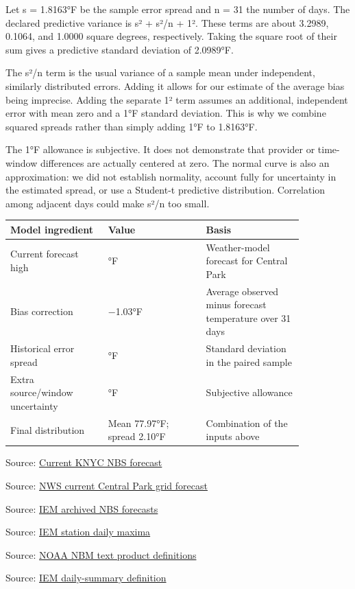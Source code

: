 \documentclass[11pt]{article}
\begin{document}
Let s = 1.8163°F be the sample error spread and n = 31 the number of days. The declared predictive variance is s² + s²/n + 1². These terms are about 3.2989, 0.1064, and 1.0000 square degrees, respectively. Taking the square root of their sum gives a predictive standard deviation of 2.0989°F.


The s²/n term is the usual variance of a sample mean under independent, similarly distributed errors. Adding it allows for our estimate of the average bias being imprecise. Adding the separate 1² term assumes an additional, independent error with mean zero and a 1°F standard deviation. This is why we combine squared spreads rather than simply adding 1°F to 1.8163°F.


The 1°F allowance is subjective. It does not demonstrate that provider or time-window differences are actually centered at zero. The normal curve is also an approximation: we did not establish normality, account fully for uncertainty in the estimated spread, or use a Student-t predictive distribution. Correlation among adjacent days could make s²/n too small.


\begin{longtable}{>{\raggedright\arraybackslash}p{0.283\linewidth}>{\raggedright\arraybackslash}p{0.283\linewidth}>{\raggedright\arraybackslash}p{0.283\linewidth}}
\textbf{Model ingredient} & \textbf{Value} & \textbf{Basis} \\ \hline\endhead
Current forecast high & 79°F & Weather-model forecast for Central Park \\
Bias correction & −1.03°F & Average observed minus forecast temperature over 31 days \\
Historical error spread & 1.82°F & Standard deviation in the paired sample \\
Extra source/window uncertainty & 1°F & Subjective allowance \\
Final distribution & Mean 77.97°F; spread 2.10°F & Combination of the inputs above \\
\end{longtable}
\par{\small Source: \href{https://mesonet.agron.iastate.edu/api/1/mos.json?station=KNYC\&model=NBS\&runtime=2026-09-16T06\%3A00Z}{Current KNYC NBS forecast}}
\par{\small Source: \href{https://api.weather.gov/gridpoints/OKX/34,45/forecast}{NWS current Central Park grid forecast}}
\par{\small Source: \href{https://mesonet.agron.iastate.edu/cgi-bin/request/mos.py?station=KNYC\&model=NBS\&sts=2026-08-16T00\%3A00Z\&ets=2026-09-16T00\%3A00Z\&format=csv}{IEM archived NBS forecasts}}
\par{\small Source: \href{https://mesonet.agron.iastate.edu/cgi-bin/request/daily.py?sts=2026-08-16\&ets=2026-09-15\&network=NY\_ASOS\&stations=NYC\&var=max\_temp\_f\&format=csv}{IEM station daily maxima}}
\par{\small Source: \href{https://vlab.noaa.gov/web/mdl/nbm-textcard-v5.0}{NOAA NBM text product definitions}}
\par{\small Source: \href{https://mesonet.agron.iastate.edu/cgi-bin/request/daily.py?help=}{IEM daily-summary definition}}
\end{document}
